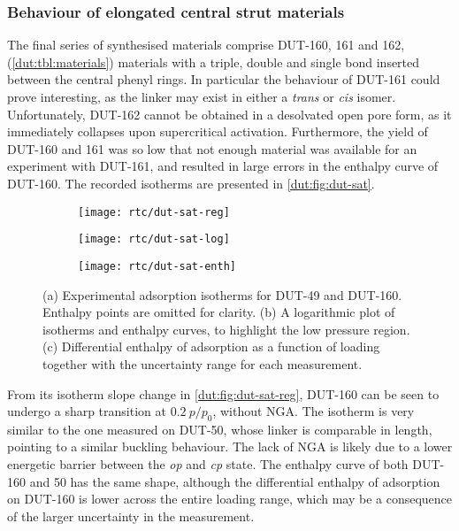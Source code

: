 \subsubsection{Behaviour of elongated central strut materials}

The final series of synthesised materials comprise DUT-160, 
161 and 162, (\autoref{dut:tbl:materials}) 
materials with a triple, double and single bond 
inserted between the central phenyl rings. In particular 
the behaviour of DUT-161 could prove interesting, as the linker 
may exist in either a \textit{trans} or \textit{cis} isomer.
Unfortunately, DUT-162 cannot be obtained in a desolvated open 
pore form, as it 
immediately collapses upon supercritical activation. Furthermore,
the yield of DUT-160 and 161 was so low that not enough 
material was available for an experiment with DUT-161, and resulted
in large errors in the enthalpy curve of DUT-160.
The recorded isotherms are presented in \autoref{dut:fig:dut-sat}.

\begin{figure}[htb]
    \centering
    \begin{subfigure}{0.33\linewidth}
        \texttt{[image: rtc/dut-sat-reg]}%
        \caption{}\label{dut:fig:dut-sat-reg}
    \end{subfigure}%
    \begin{subfigure}{0.33\linewidth}
        \texttt{[image: rtc/dut-sat-log]}%
        \caption{}\label{dut:fig:dut-sat-log}
    \end{subfigure}%
    \begin{subfigure}{0.33\linewidth}
        \texttt{[image: rtc/dut-sat-enth]}%
        \caption{}\label{dut:fig:dut-sat-enth}
    \end{subfigure}%
    \caption{(a) Experimental adsorption isotherms for DUT-49 and 
    DUT-160. Enthalpy points are omitted for clarity. 
    (b) A logarithmic plot of isotherms and enthalpy curves,
    to highlight the low pressure region. 
    (c) Differential enthalpy of adsorption as a function of loading
    together with the uncertainty range for each measurement.}%
    \label{dut:fig:dut-sat}
\end{figure}

From its isotherm slope change in \autoref{dut:fig:dut-sat-reg},
DUT-160 can be seen to undergo a sharp transition at 
\(0.2~p/p_0\), without NGA. The isotherm is very similar to the one
measured on DUT-50, whose linker is comparable in length, pointing to 
a similar buckling behaviour. The lack of NGA is likely due to 
a lower energetic barrier between the \textit{op} and \textit{cp}
state. The enthalpy curve of both DUT-160 and 50 has the same 
shape, although the differential enthalpy of adsorption on 
DUT-160 is lower across the entire loading range, which may 
be a consequence of the larger uncertainty in the measurement.

